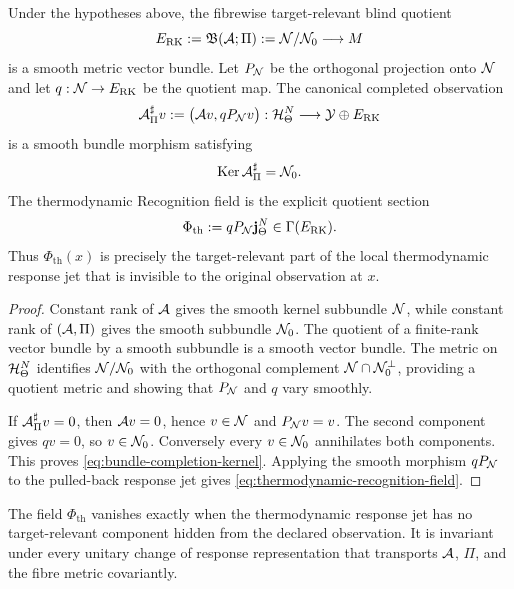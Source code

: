 \begin{theorem}
\label{thm:thermodynamic-recognition-bundle}
Under the hypotheses above, the fibrewise target-relevant blind quotient
\begin{equation}
E_{\mathrm{RK}}
:=\mathfrak B(\mathcal A;\Pi)
:=\mathcal N/\mathcal N_0
\longrightarrow M
\label{eq:recognition-quotient-bundle}
\end{equation}
is a smooth metric vector bundle.  Let $P_{\mathcal N}$ be the orthogonal projection onto $\mathcal N$ and let $q:\mathcal N\to E_{\mathrm{RK}}$ be the quotient map.  The canonical completed observation
\begin{equation}
\mathcal A_\Pi^\sharp v
:=\bigl(\mathcal A v,qP_{\mathcal N}v\bigr)
:\mathcal H^N_\Theta\longrightarrow\mathcal Y\oplus E_{\mathrm{RK}}
\label{eq:bundle-canonical-completion}
\end{equation}
is a smooth bundle morphism satisfying
\begin{equation}
\operatorname{Ker}\mathcal A_\Pi^\sharp=\mathcal N_0.
\label{eq:bundle-completion-kernel}
\end{equation}
The thermodynamic Recognition field is the explicit quotient section
\begin{equation}
\Phi_{\mathrm{th}}
:=qP_{\mathcal N}\mathbf j^N_\Theta
\in\Gamma(E_{\mathrm{RK}}).
\label{eq:thermodynamic-recognition-field}
\end{equation}
Thus $\Phi_{\mathrm{th}}(x)$ is precisely the target-relevant part of the local thermodynamic response jet that is invisible to the original observation at $x$.
\end{theorem}

\begin{proof}
Constant rank of $\mathcal A$ gives the smooth kernel subbundle $\mathcal N$, while constant rank of $(\mathcal A,\Pi)$ gives the smooth subbundle $\mathcal N_0$.  The quotient of a finite-rank vector bundle by a smooth subbundle is a smooth vector bundle.  The metric on $\mathcal H^N_\Theta$ identifies $\mathcal N/\mathcal N_0$ with the orthogonal complement $\mathcal N\cap\mathcal N_0^\perp$, providing a quotient metric and showing that $P_{\mathcal N}$ and $q$ vary smoothly.

If $\mathcal A_\Pi^\sharp v=0$, then $\mathcal A v=0$, hence $v\in\mathcal N$ and $P_{\mathcal N}v=v$.  The second component gives $qv=0$, so $v\in\mathcal N_0$.  Conversely every $v\in\mathcal N_0$ annihilates both components.  This proves \eqref{eq:bundle-completion-kernel}.  Applying the smooth morphism $qP_{\mathcal N}$ to the pulled-back response jet gives \eqref{eq:thermodynamic-recognition-field}.
\end{proof}

\begin{corollary}
\label{cor:recognition-field-meaning}
The field $\Phi_{\mathrm{th}}$ vanishes exactly when the thermodynamic response jet has no target-relevant component hidden from the declared observation.  It is invariant under every unitary change of response representation that transports $\mathcal A$, $\Pi$, and the fibre metric covariantly.
\end{corollary}

